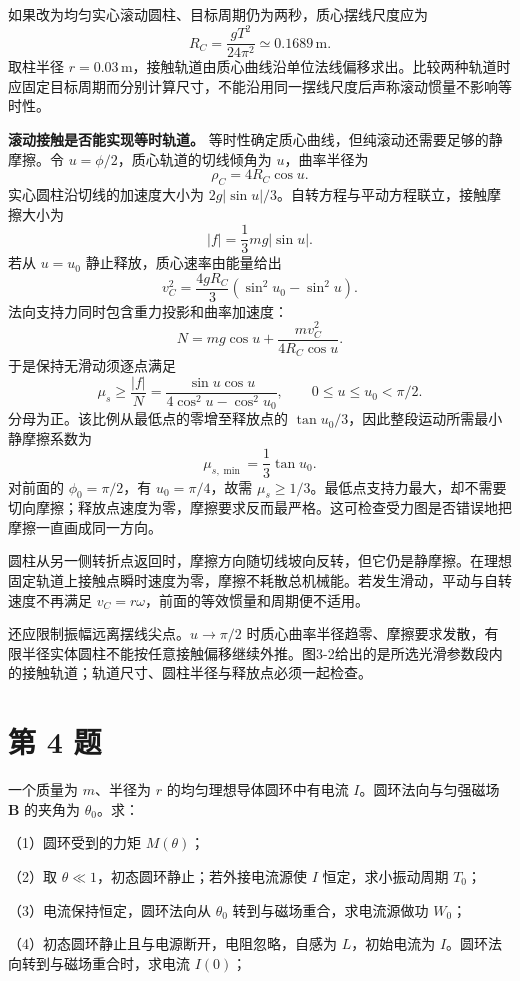 \documentclass[12pt,a4paper,UTF8]{ctexart}
\begin{document}
如果改为均匀实心滚动圆柱、目标周期仍为两秒，质心摆线尺度应为 \[
R_C=\frac{gT^2}{24\pi^2}\simeq0.1689\,\mathrm m.
\] 取柱半径
\(r=0.03\,\mathrm m\)，接触轨道由质心曲线沿单位法线偏移求出。比较两种轨道时应固定目标周期而分别计算尺寸，不能沿用同一摆线尺度后声称滚动惯量不影响等时性。

\textbf{滚动接触是否能实现等时轨道。}
等时性确定质心曲线，但纯滚动还需要足够的静摩擦。令
\(u=\phi/2\)，质心轨道的切线倾角为 \(u\)，曲率半径为 \[
\rho_C=4R_C\cos u.
\] 实心圆柱沿切线的加速度大小为
\(2g|\sin u|/3\)。自转方程与平动方程联立，接触摩擦大小为 \[
|f|=\frac13mg|\sin u|.
\] 若从 \(u=u_0\) 静止释放，质心速率由能量给出 \[
v_C^2=\frac{4gR_C}{3}(\sin^2u_0-\sin^2u).
\] 法向支持力同时包含重力投影和曲率加速度： \[
N=mg\cos u+\frac{mv_C^2}{4R_C\cos u}.
\] 于是保持无滑动须逐点满足 \[
\mu_s\ge\frac{|f|}{N}
=\frac{\sin u\cos u}{4\cos^2u-\cos^2u_0},\qquad0\le u\le u_0<\pi/2.
\] 分母为正。该比例从最低点的零增至释放点的
\(\tan u_0/3\)，因此整段运动所需最小静摩擦系数为 \[
\mu_{s,\min}=\frac13\tan u_0.
\] 对前面的 \(\phi_0=\pi/2\)，有 \(u_0=\pi/4\)，故需
\(\mu_s\ge1/3\)。最低点支持力最大，却不需要切向摩擦；释放点速度为零，摩擦要求反而最严格。这可检查受力图是否错误地把摩擦一直画成同一方向。

圆柱从另一侧转折点返回时，摩擦方向随切线坡向反转，但它仍是静摩擦。在理想固定轨道上接触点瞬时速度为零，摩擦不耗散总机械能。若发生滑动，平动与自转速度不再满足
\(v_C=r\omega\)，前面的等效惯量和周期便不适用。

还应限制振幅远离摆线尖点。\(u\to\pi/2\)
时质心曲率半径趋零、摩擦要求发散，有限半径实体圆柱不能按任意接触偏移继续外推。图3-2给出的是所选光滑参数段内的接触轨道；轨道尺寸、圆柱半径与释放点必须一起检查。

\newpage

\section{第 4 题}\label{ux7b2c-4-ux9898}

一个质量为 \(m\)、半径为 \(r\) 的均匀理想导体圆环中有电流
\(I\)。圆环法向与匀强磁场 \(\bm B\) 的夹角为 \(\theta_0\)。求：

（1）圆环受到的力矩 \(M(\theta)\)；

（2）取 \(\theta\ll1\)，初态圆环静止；若外接电流源使 \(I\)
恒定，求小振动周期 \(T_0\)；

（3）电流保持恒定，圆环法向从 \(\theta_0\) 转到与磁场重合，求电流源做功
\(W_0\)；

（4）初态圆环静止且与电源断开，电阻忽略，自感为 \(L\)，初始电流为
\(I\)。圆环法向转到与磁场重合时，求电流 \(I(0)\)；
\end{document}
